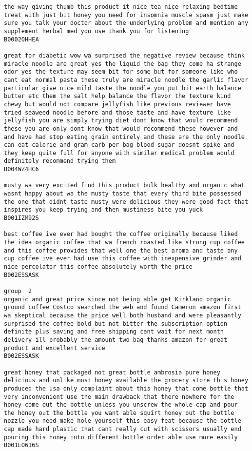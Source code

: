 \documentclass[11pt]{article}
\begin{document}
\begin{Verbatim}[commandchars=\\\{\}]
the way giving thumb this product it nice tea nice relaxing bedtime treat with just bit honey you need for insomnia muscle spasm just make sure you talk your doctor about the underlying problem and mention any supplement herbal med you use thank you for listening
B00020HHEA

great for diabetic wow wa surprised the negative review because think miracle noodle are great yes the liquid the bag they come ha strange odor yes the texture may seem bit for some but for someone like who cant eat normal pasta these truly are miracle noodle the garlic flavor particular give nice mild taste the noodle you put bit earth balance butter etc them the salt help balance the flavor the texture kind chewy but would not compare jellyfish like previous reviewer have tried seaweed noodle before and those taste and have texture like jellyfish you are simply trying diet dont know that would recommend these you are only dont know that would recommend these however and and have had stop eating grain entirely and these are the only noodle can eat calorie and gram carb per bag blood sugar doesnt spike and they keep quite full for anyone with similar medical problem would definitely recommend trying them
B004WZ4HC6

musty wa very excited find this product bulk healthy and organic what wasnt happy about wa the musty taste that every third bite possessed the one that didnt taste musty were delicious they were good fact that inspires you keep trying and then mustiness bite you yuck
B001IZM92S

best coffee ive ever had bought the coffee originally because liked the idea organic coffee that wa french roasted like strong cup coffee and this coffee provides that well one the best aroma and taste any cup coffee ive ever had use this coffee with inexpensive grinder and nice percolator this coffee absolutely worth the price
B002ESSASK

group  2
organic and great price since not being able get Kirkland organic ground coffee Costco searched the web and found Cameron amazon first wa skeptical because the price well both husband and were pleasantly surprised the coffee bold but not bitter the subscription option definite plus saving and free shipping cant wait for next month delivery ill probably the amount two bag thanks amazon for great product and excellent service
B002ESSASK

great honey that packaged not great bottle ambrosia pure honey delicious and unlike most honey available the grocery store this honey produced the usa only complaint about this honey that come bottle that very inconvenient use the main drawback that there nowhere for the honey come out the bottle unless you unscrew the whole cap and pour the honey out the bottle you want able squirt honey out the bottle nozzle you need make hole yourself this easy feat because the bottle cap made hard plastic that cant really cut with scissors usually end pouring this honey into different bottle order able use more easily
B001EO616S


\end{Verbatim}
\end{document}
